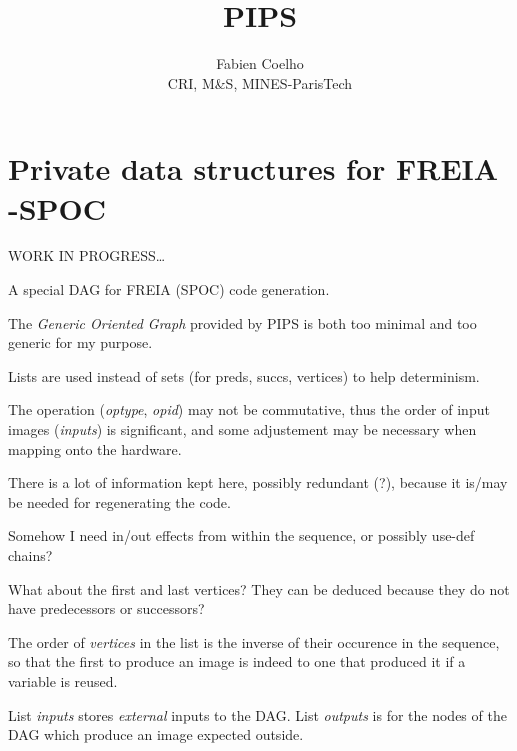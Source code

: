 \documentclass[a4paper,11pt]{article}
\title{PIPS}
\author{Fabien Coelho \\
CRI, M\&S, MINES-ParisTech}
\begin{document}
\maketitle

\section{Private data structures for FREIA -SPOC}
\label{sec:freia-spoc}

WORK IN PROGRESS\ldots

A special DAG for FREIA (SPOC) code generation.

The \emph{Generic Oriented Graph} provided by PIPS is both too minimal
and too generic for my purpose.

Lists are used instead of sets (for preds, succs, vertices) to help
determinism.

{}

{}

{}

{}

The operation (\emph{optype}, \emph{opid}) may not be commutative,
thus the order of input images (\emph{inputs}) is significant, and some
adjustement may be necessary when mapping onto the hardware.

There is a lot of information kept here, possibly redundant (?), because
it is/may be needed for regenerating the code.

Somehow I need in/out effects from within the sequence, or possibly
use-def chains?

{}

What about the first and last vertices? They can be deduced because
they do not have predecessors or successors?

{}

The order of \emph{vertices} in the list is the inverse of their
occurence in the sequence, so that the first to produce an image is
indeed to one that produced it if a variable is reused.

List \emph{inputs} stores \emph{external} inputs to the DAG.
List \emph{outputs} is for the nodes of the DAG which produce
an image expected outside.
\end{document}
